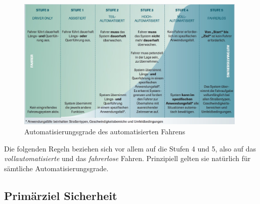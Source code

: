 \documentclass[twoside,a4paper,12pt]{article}
\begin{document}
\begin{figure}[H]
\centering
\includegraphics[width=11cm]{resources/uebersicht-stufen-der-automatisierung.jpg}
\caption[Automatisierungsgrade des automatisierten Fahrens]{Automatisierungsgrade des automatisierten Fahrens~\cite{vda}}
\label{figure:Automatisierungsgrade}
\end{figure}

Die folgenden Regeln beziehen sich vor allem auf die Stufen 4 und 5, also auf das \textit{vollautomatisierte} und das \textit{fahrerlose} Fahren.
Prinzipiell gelten sie natürlich für sämtliche Automatisierungsgrade.

\subsection{Primärziel Sicherheit} \label{PrimaerzielSicherheit}
\end{document}
